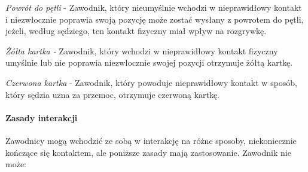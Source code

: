 \documentclass[12pt]{article}
\begin{document}
\emph{Powrót do pętli} - Zawodnik, który nieumyślnie wchodzi w
nieprawidłowy kontakt i niezwłocznie poprawia swoją pozycję może zostać
wysłany z powrotem do pętli, jeżeli, według sędziego, ten kontakt
fizyczny miał wpływ na rozgrywkę.

\emph{Żółta kartka -} Zawodnik, który wchodzi w nieprawidłowy kontakt
fizyczny umyślnie lub nie poprawia niezwłocznie swojej pozycji otrzymuje
żółtą kartkę.

\emph{Czerwona kartka} - Zawodnik, który powoduje nieprawidłowy kontakt
w sposób, który sędzia uzna za przemoc, otrzymuje czerwoną kartkę.

\paragraph{Zasady interakcji}
Zawodnicy mogą wchodzić ze sobą w
interakcję na różne sposoby, niekoniecznie kończące się kontaktem, ale
poniższe zasady mają zastosowanie. Zawodnik nie może:
\end{document}
